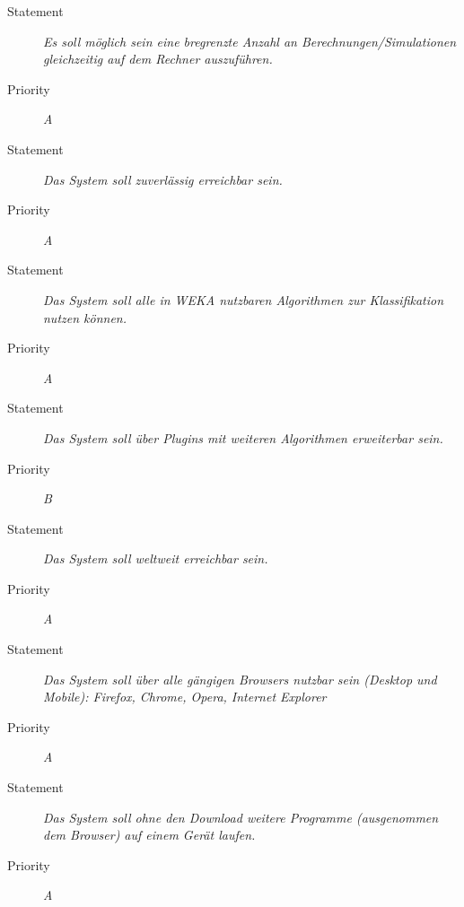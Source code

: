 \UR
\begin{description}
	\item[Statement] \textit{Es soll möglich sein eine bregrenzte Anzahl an Berechnungen/Simulationen gleichzeitig auf dem Rechner auszuführen.} %
	\item[Priority] \textit{A}
\end{description}

\UR
\begin{description}
	\item[Statement] \textit{Das System soll zuverlässig erreichbar sein.}
	\item[Priority] \textit{A}
\end{description}

\UR
\begin{description}
  \item[Statement] \textit{Das System soll alle in WEKA nutzbaren Algorithmen zur Klassifikation nutzen können.}
  \item[Priority] \textit{A}
\end{description}


\UR
\begin{description}
	\item[Statement] \textit{Das System soll über \gls{Plugins} mit weiteren Algorithmen erweiterbar sein.}
	\item[Priority] \textit{B}
\end{description}


\UR
\begin{description}
	\item[Statement] \textit{Das System soll weltweit erreichbar sein.}
	\item[Priority] \textit{A}
\end{description}


\UR
\begin{description}
  \item[Statement] \textit{Das System soll über alle gängigen \glspl{Browser} nutzbar sein (Desktop und Mobile): Firefox, Chrome, Opera, Internet Explorer} %
  \item[Priority] \textit{A}
\end{description}

\UR
\begin{description}
	\item[Statement] \textit{Das System soll ohne den Download weitere Programme (ausgenommen dem Browser) auf einem Gerät laufen.}
	\item[Priority] \textit{A}
\end{description}

